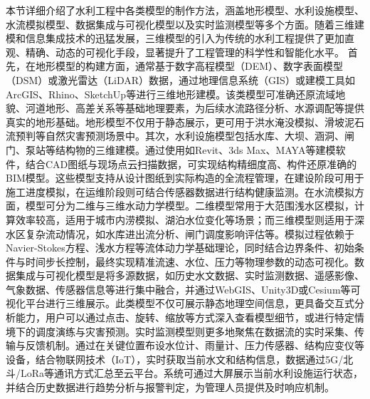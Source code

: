 本节详细介绍了水利工程中各类模型的制作方法，涵盖地形模型、水利设施模型、水流模拟模型、数据集成与可视化模型以及实时监测模型等多个方面。随着三维建模和信息集成技术的迅猛发展，三维模型的引入为传统的水利工程提供了更加直观、精确、动态的可视化手段，显著提升了工程管理的科学性和智能化水平。 首先，在地形模型的构建方面，通常基于数字高程模型（DEM）、数字表面模型（DSM）或激光雷达（LiDAR）数据，通过地理信息系统（GIS）或建模工具如ArcGIS、Rhino、SketchUp等进行三维地形建模。该类模型可准确还原流域地貌、河道地形、高差关系等基础地理要素，为后续水流路径分析、水源调配等提供真实的地形基础。地形模型不仅用于静态展示，更可用于洪水淹没模拟、滑坡泥石流预判等自然灾害预测场景中。其次，水利设施模型包括水库、大坝、涵洞、闸门、泵站等结构物的三维建模。通过使用如Revit、3ds Max、MAYA等建模软件，结合CAD图纸与现场点云扫描数据，可实现结构精细度高、构件还原准确的BIM模型。这些模型支持从设计图纸到实际构造的全流程管理，在建设阶段可用于施工进度模拟，在运维阶段则可结合传感器数据进行结构健康监测。在水流模拟方面，模型可分为二维与三维水动力学模型。二维模型常用于大范围浅水区模拟，计算效率较高，适用于城市内涝模拟、湖泊水位变化等场景；而三维模型则适用于深水区复杂流动情况，如水库进出流分析、闸门调度影响评估等。模拟过程依赖于Navier-Stokes方程、浅水方程等流体动力学基础理论，同时结合边界条件、初始条件与时间步长控制，最终实现精准流速、水位、压力等物理参数的动态可视化。数据集成与可视化模型是将多源数据，如历史水文数据、实时监测数据、遥感影像、气象数据、传感器信息等进行集中融合，并通过WebGIS、Unity3D或Cesium等可视化平台进行三维展示。此类模型不仅可展示静态地理空间信息，更具备交互式分析能力，用户可以通过点击、旋转、缩放等方式深入查看模型细节，或进行特定情境下的调度演练与灾害预测。实时监测模型则更多地聚焦在数据流的实时采集、传输与反馈机制。通过在关键位置布设水位计、雨量计、压力传感器、结构应变仪等设备，结合物联网技术（IoT），实时获取当前水文和结构信息，数据通过5G/北斗/LoRa等通讯方式汇总至云平台。系统可通过大屏展示当前水利设施运行状态，并结合历史数据进行趋势分析与报警判定，为管理人员提供及时响应机制。 